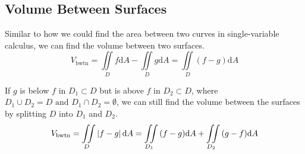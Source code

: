 \subsection{Volume Between Surfaces}
\noindent
Similar to how we could find the area between two curves in single-variable calculus, we can find the volume between two surfaces.\\
$$V_{\text{bwtn}}=\iint\limits_{D}{f\mathrm{d}A}-\iint\limits_{D}{g\mathrm{d}A}=\iint\limits_{D}{(f-g)\mathrm{d}A}$$

\noindent
If $g$ is below $f$ in $D_1\subset D$ but is above $f$ in $D_2\subset D$, where $D_1\cup D_2=D\text{ and }D_1\cap D_2=\emptyset$, we can still find the volume between the surfaces by splitting $D$ into $D_1$ and $D_2$.\\
$$V_{\text{bwtn}}=\iint\limits_{D}{\left|f-g\right|\mathrm{d}A}=\iint\limits_{D_1}{(f-g)\mathrm{d}A}+\iint\limits_{D_2}{(g-f)\mathrm{d}A}$$